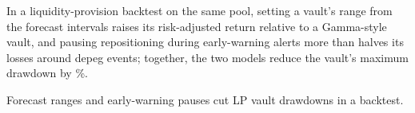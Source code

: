 %


In a liquidity-provision backtest on the same pool, setting a vault's range from the forecast intervals
raises its risk-adjusted return relative to a Gamma-style vault, and pausing repositioning during
early-warning alerts more than halves its losses around depeg events; together, the two models reduce the
vault's maximum drawdown by \lpFcKvsGammaMaxDDCut\%.


\item Forecast ranges and early-warning pauses cut LP vault drawdowns in a backtest.


